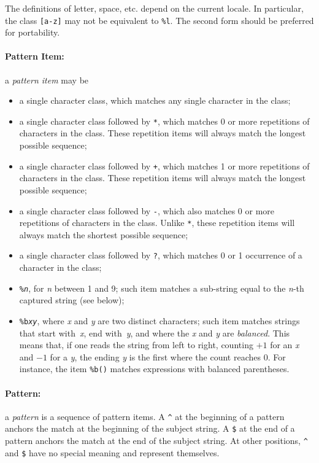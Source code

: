 \documentclass[11pt]{article}
\newcommand{\M}[1]{\rm\emph{#1}}
\newcommand{\T}[1]{{\tt #1}}
\newcommand{\Math}[1]{$#1$}
\newcommand{\Def}[1]{\emph{#1}\index{#1}}
\begin{document}
The definitions of letter, space, etc. depend on the current locale.
In particular, the class \verb|[a-z]| may not be equivalent to \verb|%l|.
The second form should be preferred for portability.

\paragraph{Pattern Item:}
a \Def{pattern item} may be
\begin{itemize}
\item
a single character class,
which matches any single character in the class;
\item
a single character class followed by \verb|*|,
which matches 0 or more repetitions of characters in the class.
These repetition items will always match the longest possible sequence;
\item
a single character class followed by \verb|+|,
which matches 1 or more repetitions of characters in the class.
These repetition items will always match the longest possible sequence;
\item
a single character class followed by \verb|-|,
which also matches 0 or more repetitions of characters in the class.
Unlike \verb|*|,
these repetition items will always match the shortest possible sequence;
\item
a single character class followed by \verb|?|,
which matches 0 or 1 occurrence of a character in the class;
\item
\T{\%\M{n}}, for \M{n} between 1 and 9;
such item matches a sub-string equal to the \M{n}-th captured string
(see below);
\item
\T{\%b\M{xy}}, where \M{x} and \M{y} are two distinct characters;
such item matches strings that start with~\M{x}, end with~\M{y},
and where the \M{x} and \M{y} are \emph{balanced}.
This means that, if one reads the string from left to right,
counting \Math{+1} for an \M{x} and \Math{-1} for a \M{y},
the ending \M{y} is the first where the count reaches 0.
For instance, the item \verb|%b()| matches expressions with
balanced parentheses.
\end{itemize}

\paragraph{Pattern:}
a \Def{pattern} is a sequence of pattern items.
A \verb|^| at the beginning of a pattern anchors the match at the
beginning of the subject string.
A \verb|$| at the end of a pattern anchors the match at the
end of the subject string.
At other positions,
\verb|^| and \verb|$| have no special meaning and represent themselves.
\end{document}

